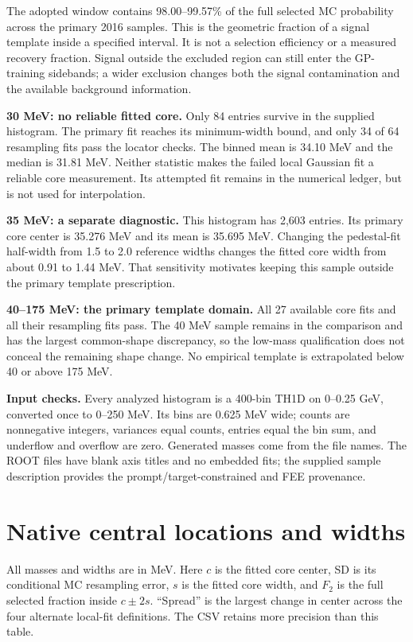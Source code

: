 The adopted window contains 98.00--99.57\% of the full selected MC probability across the primary 2016 samples. This is the geometric fraction of a signal template inside a specified interval. It is not a selection efficiency or a measured recovery fraction. Signal outside the excluded region can still enter the GP-training sidebands; a wider exclusion changes both the signal contamination and the available background information.

\textbf{30 MeV: no reliable fitted core.} Only 84 entries survive in the supplied histogram. The primary fit reaches its minimum-width bound, and only 34 of 64 resampling fits pass the locator checks. The binned mean is 34.10 MeV and the median is 31.81 MeV. Neither statistic makes the failed local Gaussian fit a reliable core measurement. Its attempted fit remains in the numerical ledger, but is not used for interpolation.

\textbf{35 MeV: a separate diagnostic.} This histogram has 2,603 entries. Its primary core center is 35.276 MeV and its mean is 35.695 MeV. Changing the pedestal-fit half-width from 1.5 to 2.0 reference widths changes the fitted core width from about 0.91 to 1.44 MeV. That sensitivity motivates keeping this sample outside the primary template prescription.

\textbf{40--175 MeV: the primary template domain.} All 27 available core fits and all their resampling fits pass. The 40 MeV sample remains in the comparison and has the largest common-shape discrepancy, so the low-mass qualification does not conceal the remaining shape change. No empirical template is extrapolated below 40 or above 175 MeV.

\textbf{Input checks.} Every analyzed histogram is a 400-bin TH1D on 0--0.25 GeV, converted once to 0--250 MeV. Its bins are 0.625 MeV wide; counts are nonnegative integers, variances equal counts, entries equal the bin sum, and underflow and overflow are zero. Generated masses come from the file names. The ROOT files have blank axis titles and no embedded fits; the supplied sample description provides the prompt/target-constrained and FEE provenance.

\clearpage\section*{Native central locations and widths}

All masses and widths are in MeV. Here $c$ is the fitted core center, SD is its conditional MC resampling error, $s$ is the fitted core width, and $F_2$ is the full selected fraction inside $c\pm2s$. ``Spread'' is the largest change in center across the four alternate local-fit definitions. The CSV retains more precision than this table.

